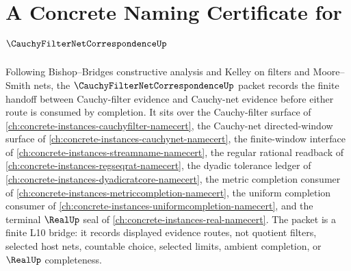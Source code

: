 \chapter{A Concrete Naming Certificate for $\CauchyFilterNetCorrespondenceUp$}
\label{ch:concrete-instances-cauchy-filter-net-correspondence-namecert}

Following Bishop--Bridges constructive analysis and Kelley on filters and Moore--Smith nets, the $\CauchyFilterNetCorrespondenceUp$ packet records the finite handoff between Cauchy-filter evidence and Cauchy-net evidence before either route is consumed by completion. It sits over the Cauchy-filter surface of \autoref{ch:concrete-instances-cauchyfilter-namecert}, the Cauchy-net directed-window surface of \autoref{ch:concrete-instances-cauchynet-namecert}, the finite-window interface of \autoref{ch:concrete-instances-streamname-namecert}, the regular rational readback of \autoref{ch:concrete-instances-regseqrat-namecert}, the dyadic tolerance ledger of \autoref{ch:concrete-instances-dyadicratcore-namecert}, the metric completion consumer of \autoref{ch:concrete-instances-metriccompletion-namecert}, the uniform completion consumer of \autoref{ch:concrete-instances-uniformcompletion-namecert}, and the terminal $\RealUp$ seal of \autoref{ch:concrete-instances-real-namecert}. The packet is a finite L10 bridge: it records displayed evidence routes, not quotient filters, selected host nets, countable choice, selected limits, ambient completion, or $\RealUp$ completeness.

